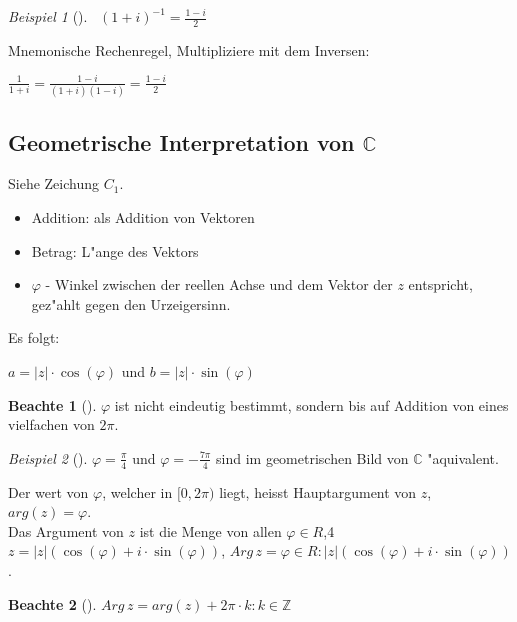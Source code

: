 \documentclass[11pt]{article}
\theoremstyle{remark}
\newtheorem{exa}{Beispiel}[section]
\theoremstyle{definition}
\newtheorem*{notte}{Beachte}
\theoremstyle{remark}
\begin{document}
\begin{exa}[] \label{} \
\((1+i)^{-1}=\frac{1-i}{2}\)
\end{exa}

Mnemonische Rechenregel, Multipliziere mit dem Inversen: 
\begin{relation}
\(\frac{1}{1+i}=\frac{1-i}{(1+i)(1-i)}=\frac{1-i}{2}\)
\end{relation}

\subsection{Geometrische Interpretation von \(\mathbb{C}\)}
\label{sec:org992fe0c}
Siehe Zeichung \(C_1\).

\begin{relation}
\begin{itemize}
\item Addition: als Addition von Vektoren
\item Betrag: L"ange des Vektors
\item \(\varphi\) - Winkel zwischen der reellen Achse und dem Vektor der \(z\) entspricht,
gez"ahlt gegen den Urzeigersinn.
\end{itemize}
\end{relation}

Es folgt:
\begin{relation}
\(a=|z|\cdot \cos(\varphi)\) und \(b=|z|\cdot \sin(\varphi)\)
\end{relation}

\begin{notte}[] \label{}
\(\varphi\) ist nicht eindeutig bestimmt, sondern bis auf Addition von eines
vielfachen von \(2\pi\).
\end{notte}

\begin{exa}[] \label{}
\(\varphi=\frac{\pi}{4}\) und \(\varphi=-\frac{7\pi}{4}\) sind im geometrischen Bild von
\(\mathbb{C}\) "aquivalent.
\end{exa}

\begin{definition}{}{}
Der wert von \(\varphi\), welcher in \([0, 2\pi)\) liegt, heisst Hauptargument von \(z\),
\(arg(z)=\varphi\).\\
Das Argument von \(z\) ist die Menge von allen \(\varphi \in R\),4
\(z=|z|(\cos(\varphi)+i\cdot \sin(\varphi))\), \(Arg\, z = {\varphi \in R : |z|(\cos(\varphi)+i\cdot \sin(\varphi))}\).
\end{definition}

\begin{notte}[] \label{}
\(Arg\, z= {arg(z)+2\pi\cdot k : k\in \mathbb{Z}}\)
\end{notte}
\end{document}
